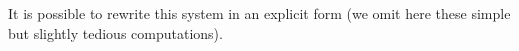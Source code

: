 It is possible to rewrite this system in an explicit form (we omit here these simple but slightly tedious computations).
%
%
%
